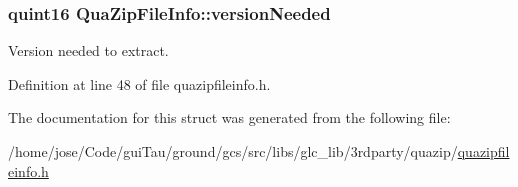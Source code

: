 \hypertarget{struct_qua_zip_file_info_a8b73982808bded49e88e624a65e1a94f}{
\subsubsection[{version\-Needed}]{\setlength{\rightskip}{0pt plus 5cm}quint16 Qua\-Zip\-File\-Info\-::version\-Needed}}\label{struct_qua_zip_file_info_a8b73982808bded49e88e624a65e1a94f}


Version needed to extract. 



Definition at line 48 of file quazipfileinfo.\-h.



The documentation for this struct was generated from the following file\-:\begin{DoxyCompactItemize}
\item 
/home/jose/\-Code/gui\-Tau/ground/gcs/src/libs/glc\-\_\-lib/3rdparty/quazip/\hyperlink{quazipfileinfo_8h}{quazipfileinfo.\-h}\end{DoxyCompactItemize}
